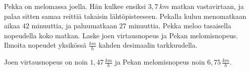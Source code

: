\begin{tehtavasivu}
\begin{tehtava}
	Pekka on melomassa joella. Hän kulkee ensiksi $3,7\,km$ matkan vastavirtaan, ja palaa sitten 
	samaa reittiä takaisin lähtöpisteeseen. Pekalla kuluu menomatkaan aikaa $42$ minuuttia, ja 
	paluumatkaan $27$ minuuttia. Pekka meloo tasaisella nopeudella koko matkan. Laske joen 
	virtausnopeus ja Pekan melomisnopeus. Ilmoita nopeudet yksikössä $\frac{km}{h}$ kahden 
	desimaalin tarkkuudella.
		\begin{vastaus}
			Joen virtausnopeus on noin $1,47\,\frac{km}{h}$ ja Pekan melomisnopeus noin 
			$6,75\,\frac{km}{h}$.
		\end{vastaus}
\end{tehtava}


\end{tehtavasivu}